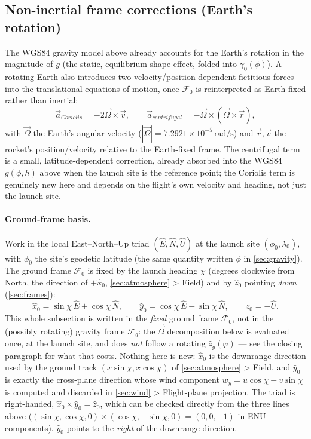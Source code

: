 \subsection{Non-inertial frame corrections (Earth's rotation)}\label{sec:noninertial}
The WGS84 gravity model above already accounts for the Earth's rotation in the magnitude of $g$
(the static, equilibrium-shape effect, folded into $\gamma_0(\phi)$). A rotating Earth also
introduces two velocity/position-dependent fictitious forces into the translational equations of
motion, once $\mathcal{F}_0$ is reinterpreted as Earth-fixed rather than inertial:
\begin{equation}
    \vec{a}_{Coriolis} = -2\vec{\Omega}\times\vec{v}, \qquad
    \vec{a}_{centrifugal} = -\vec{\Omega}\times(\vec{\Omega}\times\vec{r}),
\end{equation}
with $\vec{\Omega}$ the Earth's angular velocity ($|\vec{\Omega}|=7.2921\times10^{-5}\,
\mathrm{rad/s}$) and $\vec{r},\vec{v}$ the rocket's position/velocity relative to the Earth-fixed
frame. The centrifugal term is a small, latitude-dependent correction, already absorbed into the
WGS84 $g(\phi,h)$ above when the launch site is the reference point; the Coriolis term is
genuinely new here and depends on the flight's own velocity and heading, not just the launch site.

\paragraph{Ground-frame basis.} Work in the local East--North--Up triad $(\hat{E},\hat{N},\hat{U})$
at the launch site $(\phi_0,\lambda_0)$, with $\phi_0$ the site's geodetic latitude (the same
quantity written $\phi$ in \autoref{sec:gravity}). The ground frame $\mathcal{F}_0$ is fixed by the
launch heading $\chi$ (degrees clockwise from North, the direction of $+\hat{x}_0$,
\autoref{sec:atmosphere} > Field) and by $\hat{z}_0$ pointing \emph{down} (\autoref{sec:frames}):
\begin{equation}
    \hat{x}_0 = \sin\chi\,\hat{E} + \cos\chi\,\hat{N}, \qquad
    \hat{y}_0 = \cos\chi\,\hat{E} - \sin\chi\,\hat{N}, \qquad
    \hat{z}_0 = -\hat{U}.
\end{equation}
This whole subsection is written in the \emph{fixed} ground frame $\mathcal{F}_0$, not in the
(possibly rotating) gravity frame $\mathcal{F}_g$: the $\vec{\Omega}$ decomposition below is
evaluated once, at the launch site, and does \emph{not} follow a rotating $\hat{z}_g(\varphi)$ ---
see the closing paragraph for what that costs. Nothing here is new: $\hat{x}_0$ is the downrange
direction used by the ground track $(x\sin\chi,x\cos\chi)$ of \autoref{sec:atmosphere} > Field,
and $\hat{y}_0$ is exactly the cross-plane direction whose wind component $w_y=u\cos\chi-v\sin\chi$
is computed and discarded in \autoref{sec:wind} > Flight-plane projection. The triad is
right-handed, $\hat{x}_0\times\hat{y}_0=\hat{z}_0$, which can be checked directly from the three
lines above ($(\sin\chi,\cos\chi,0)\times(\cos\chi,-\sin\chi,0)=(0,0,-1)$ in ENU components).
$\hat{y}_0$ points to the \emph{right} of the downrange direction.

